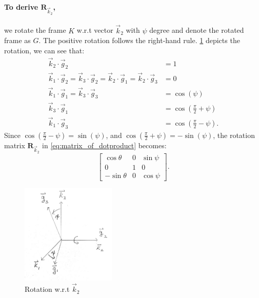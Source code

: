 \documentclass{article}
\newcommand{\mat}[1]{\mathbf{#1}}
\newcommand{\MR}{\mat{R}}
\begin{document}
\paragraph{To derive $\MR_{\vec{k}_2}$,} we rotate the frame $K$ w.r.t vector $\vec{k}_2$ with $\psi$ degree and denote the rotated frame as $G$. The positive rotation follows the right-hand rule. \cref{fig:second_rotation} depicts the rotation, we can see that:
\begin{align*}
    \vec{k}_2\cdot\vec{g}_2 &=1 \\
    \vec{k}_1\cdot\vec{g}_2 = \vec{k}_3\cdot\vec{g}_2 = \vec{k}_2\cdot\vec{g}_1 = \vec{k}_2\cdot\vec{g}_3 &= 0 \\
    \vec{k}_1\cdot\vec{g}_1 = \vec{k}_3\cdot\vec{g}_3 &=\cos{(\psi)}\\
    \vec{k}_3\cdot\vec{g}_1 &=\cos{(\frac{\pi}{2} + \psi)} \\
    \vec{k}_1\cdot\vec{g}_3 &=\cos{(\frac{\pi}{2} - \psi)}.
\end{align*}
Since $\cos{(\frac{\pi}{2} - \psi)} = \sin{(\psi)}$, and $\cos{(\frac{\pi}{2} + \psi)} = -\sin{(\psi)}$, the rotation matrix $\MR_{\vec{k}_2}$ in \cref{eq:matrix_of_dotproduct} becomes:
\begin{equation*}
    \begin{bmatrix}
      \cos{\theta} & 0 & \sin{\psi} \\
      0 & 1 & 0 \\
      -\sin{\theta} & 0 & \cos{\psi}
    \end{bmatrix}.
\end{equation*}

\begin{figure}[h]
    \centering
    \includegraphics[width=0.4\textwidth]{Figures/UWS-rotation-second.png}
    \caption{Rotation w.r.t $\vec{k}_2$}
    \label{fig:second_rotation}
\end{figure}
\end{document}
